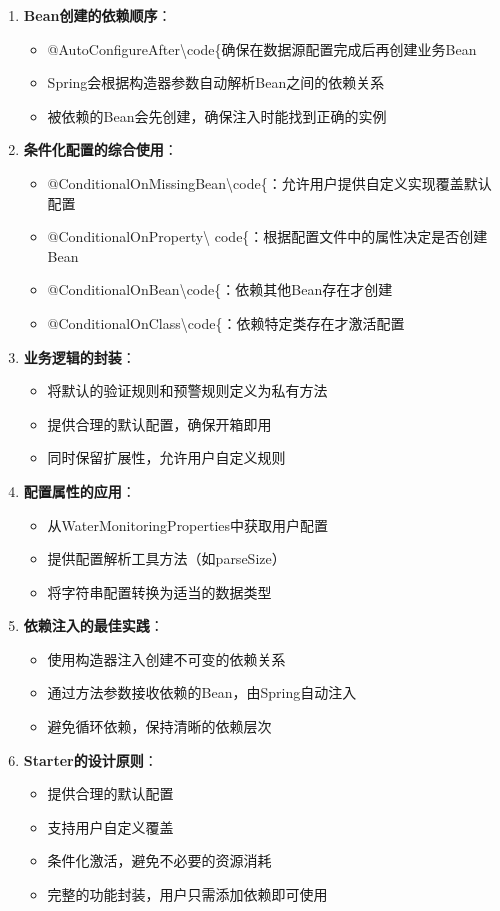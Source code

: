 \begin{enumerate} \def\labelenumi{\arabic{enumi}.} \tightlist \item \textbf{Bean创建的依赖顺序}： \begin{itemize} \tightlist
\item @AutoConfigureAfter\textbackslash code\{确保在数据源配置完成后再创建业务Bean \item Spring会根据构造器参数自动解析Bean之间的依赖关系 \item
被依赖的Bean会先创建，确保注入时能找到正确的实例 \end{itemize} \item \textbf{条件化配置的综合使用}： \begin{itemize} \tightlist \item
@ConditionalOnMissingBean\textbackslash code\{：允许用户提供自定义实现覆盖默认配置 \item @ConditionalOnProperty\textbackslash
code\{：根据配置文件中的属性决定是否创建Bean \item @ConditionalOnBean\textbackslash code\{：依赖其他Bean存在才创建 \item
@ConditionalOnClass\textbackslash code\{：依赖特定类存在才激活配置 \end{itemize} \item \textbf{业务逻辑的封装}： \begin{itemize} \tightlist
\item 将默认的验证规则和预警规则定义为私有方法 \item 提供合理的默认配置，确保开箱即用 \item 同时保留扩展性，允许用户自定义规则 \end{itemize} \item \textbf{配置属性的应用}：
\begin{itemize} \tightlist \item 从WaterMonitoringProperties中获取用户配置 \item 提供配置解析工具方法（如parseSize） \item 将字符串配置转换为适当的数据类型
\end{itemize} \item \textbf{依赖注入的最佳实践}： \begin{itemize} \tightlist \item 使用构造器注入创建不可变的依赖关系 \item
通过方法参数接收依赖的Bean，由Spring自动注入 \item 避免循环依赖，保持清晰的依赖层次 \end{itemize} \item \textbf{Starter的设计原则}： \begin{itemize} \tightlist
\item 提供合理的默认配置 \item 支持用户自定义覆盖 \item 条件化激活，避免不必要的资源消耗 \item 完整的功能封装，用户只需添加依赖即可使用 \end{itemize} \end{enumerate}
